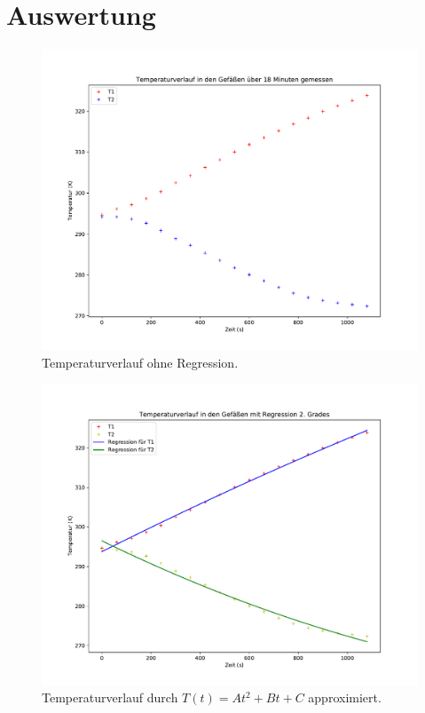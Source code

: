 \section{Auswertung}
\begin{figure}[p]
  \centering
  \includegraphics[width=\textwidth]{verlauf.pdf}
  \caption{Temperaturverlauf ohne Regression.}
  \label{fig:5}
\end{figure}
\label{sec:Auswertung}
\begin{figure}[p]
  \centering
  \includegraphics[width=\textwidth]{Grad2.pdf}
  \caption{Temperaturverlauf durch $T(t) = At^2 + Bt + C$ approximiert.}
  \label{fig:3}
\end{figure}
